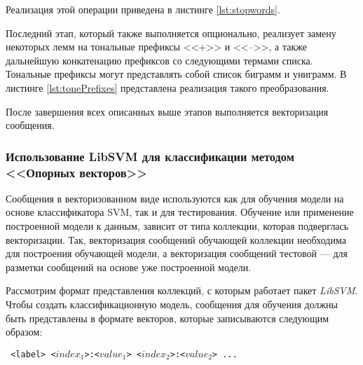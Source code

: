     Реализация этой операции приведена в листинге \ref{lst:stopwords}.
    \lstset{style=python}
    

    Последний этап, который также выполняется опционально, реализует замену
    некоторых лемм на тональные префиксы <<+>> и <<-->>, а также дальнейшую
    конкатенацию префиксов со следующими термами списка. Тональные префиксы
    могут представлять собой список биграмм и униграмм. В листинге
    \ref{lst:tonePrefixes} представлена реализация такого преобразования.

    \lstset{style=python}
    


    После завершения всех описанных выше этапов выполняется векторизация
    сообщения.

    \subsubsection{Использование LibSVM для классификации методом <<Опорных векторов>>}

    Сообщения в векторизованном виде используются как для обучения
    модели на основе классификатора SVM, так и для тестирования.
    Обучение или применение построенной модели к данным, зависит от типа коллекции,
    которая подверглась векторизации.
    Так, векторизация сообщений обучающей коллекции необходима для построения
    обучающей модели, а векторизация сообщений тестовой --- для разметки сообщений
    на основе уже построенной модели.

    Рассмотрим формат представления коллекций, с которым работает пакет {\it LibSVM}.
    Чтобы создать классификационную модель, сообщения для обучения должны быть
    представлены в формате векторов, которые записываются следующим образом:
    \begin{center}
        \tt
        <label> <$index_1$>:<$value_1$> <$index_2$>:<$value_2$> ...
    \end{center}

